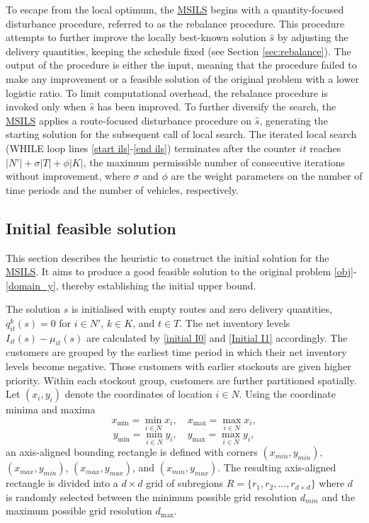 \documentclass{article}
\begin{document}
To escape from the local optimum, the \hyperref[alg:MSILS]{MSILS} begins with a quantity-focused disturbance procedure, referred to as the rebalance procedure. This procedure attempts to further improve the locally best-known solution $\hat{s}$ by adjusting the delivery quantities, keeping the schedule fixed (see Section \ref{sec:rebalance}). The output of the procedure is either the input, meaning that the procedure failed to make any improvement or a feasible solution of the original problem with a lower logistic ratio. To limit computational overhead, the rebalance procedure is invoked only when $\hat{s}$ has been improved. To further diversify the search, the \hyperref[alg:MSILS]{MSILS} applies a route-focused disturbance procedure on $\hat{s}$, generating the starting solution for the subsequent call of local search. The iterated local search (WHILE loop lines \ref{start ils}-\ref{end ils}) terminates after the counter $it$ reaches $|N'|+\sigma|T|+\phi|K|$, the maximum permissible number of consecutive iterations without improvement, where $\sigma$ and $\phi$ are the weight parameters on the number of time periods and the number of vehicles, respectively. 



\subsection{Initial feasible solution} \label{sec:initial procedure}

This section describes the heuristic to construct the initial solution for the \hyperref[alg:MSILS]{MSILS}. It aims to produce a good feasible solution to the original problem \eqref{obj}-\eqref{domain_y}, thereby establishing the initial upper bound. 

The solution $s$ is initialised with empty routes and zero delivery quantities, $q^k_{it}(s)=0$ for $i\in N'$, $k\in K$, and $t\in T$. The net inventory levels $I_{it}(s) - \mu_{it}(s)$ are calculated by \eqref{initial I0} and \eqref{Initial I1} accordingly. The customers are grouped by the earliest time period in which their net inventory levels become negative. Those customers with earlier stockouts are given higher priority. Within each stockout group, customers are further partitioned spatially. Let $(x_i, y_i)$ denote the coordinates of location $i \in N$. Using the coordinate minima and maxima   
$$x_{\min} = \min_{i\in N} x_i,\quad x_{\max} = \max_{i\in N} x_i,$$
$$y_{\min}= \min_{i\in N} y_i,\quad y_{\max}= \max_{i\in N} y_i,$$
an axis-aligned bounding rectangle is defined with corners $(x_{min},y_{min})$, $(x_{max},y_{min})$, $(x_{max},y_{max})$, and $(x_{min},y_{max})$. The resulting axis-aligned rectangle is divided into a $d\times d$ grid of subregions $R=\{r_1,r_2,\dots,r_{d\times d}\}$ where $d$ is randomly selected between the minimum possible grid resolution $d_{min}$ and the maximum possible grid resolution $d_{\max}$. 
\end{document}
